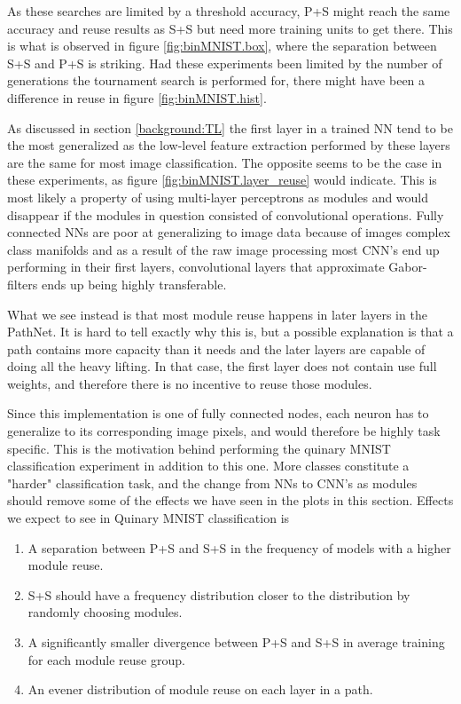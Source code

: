 As these searches are limited by a threshold accuracy, P+S might reach the same accuracy and reuse results as S+S but need more training units to get there. This is what is observed in figure \ref{fig:binMNIST.box}, where the separation between S+S and P+S is striking. Had these experiments been limited by the number of generations the tournament search is performed for, there might have been a difference in reuse in figure \ref{fig:binMNIST.hist}.

As discussed in section \ref{background:TL} the first layer in a trained NN tend to be the most generalized as the low-level feature extraction performed by these layers are the same for most image classification. The opposite seems to be the case in these experiments, as figure \ref{fig:binMNIST.layer_reuse} would indicate. This is most likely a property of using multi-layer perceptrons as modules and would disappear if the modules in question consisted of convolutional operations. Fully connected NNs are poor at generalizing to image data because of images complex class manifolds and as a result of the raw image processing most CNN's end up performing in their first layers, convolutional layers that approximate Gabor-filters ends up being highly transferable\cite{yosinski2014transferable}.

What we see instead is that most module reuse happens in later layers in the PathNet. It is hard to tell exactly why this is, but a possible explanation is that a path contains more capacity than it needs and the later layers are capable of doing all the heavy lifting. In that case, the first layer does not contain use full weights, and therefore there is no incentive to reuse those modules. 

Since this implementation is one of fully connected nodes, each neuron has to generalize to its corresponding image pixels, and would therefore be highly task specific. This is the motivation behind performing the quinary MNIST classification experiment in addition to this one. More classes constitute a "harder" classification task, and the change from NNs to CNN's as modules should remove some of the effects we have seen in the plots in this section. Effects we expect to see in Quinary MNIST classification is

\begin{enumerate}
    \item A separation between P+S and S+S in the frequency of models with a higher module reuse.
    \item S+S should have a frequency distribution closer to the distribution by randomly choosing modules.
    \item A significantly smaller divergence between P+S and S+S in average training for each module reuse group. 
    \item An evener distribution of module reuse on each layer in a path.
\end{enumerate}


